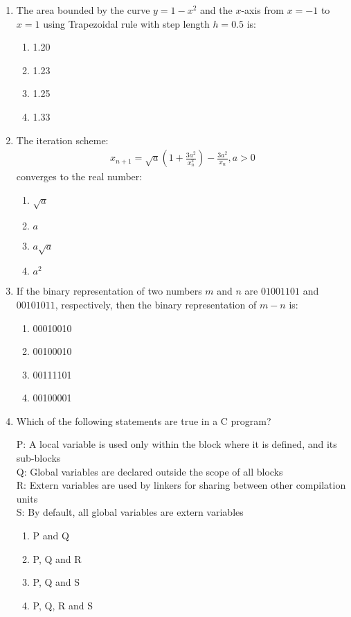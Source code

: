 \documentclass[journal,12pt,onecolumn]{IEEEtran}
\theoremstyle{remark}
\begin{document}
\begin{enumerate}
    \item The area bounded by the curve $y = 1 - x^2$ and the $x$-axis from $x = -1$ to $x = 1$ using Trapezoidal rule with step length $h = 0.5$ is:
    \begin{multicols}{4}
    \begin{enumerate}
        \item 1.20
        \item 1.23
        \item 1.25
        \item 1.33
    \end{enumerate}
\end{multicols}
    \item The iteration scheme:
    \begin{align}
    x_{n+1} = \sqrt{a} \left( 1 + \frac{3a^2}{x_n^2} \right) - \frac{3a^2}{x_n} , a > 0
    \end{align}
    converges to the real number:
    \begin{multicols}{4}
    \begin{enumerate}
        \item $\sqrt{a}$
        \item $a$
        \item $a\sqrt{a}$
        \item $a^2$
    \end{enumerate}
\end{multicols}
    \item If the binary representation of two numbers $m$ and $n$ are $01001101$ and $00101011$, respectively, then the binary representation of $m - n$ is:
    \begin{multicols}{4}
    \begin{enumerate}
        \item 00010010
        \item 00100010
        \item 00111101
        \item 00100001
    \end{enumerate}
\end{multicols}
    \item Which of the following statements are true in a C program?
    
         P: A local variable is used only within the block where it is defined, and its sub-blocks\\
         Q: Global variables are declared outside the scope of all blocks\\
         R: Extern variables are used by linkers for sharing between other compilation units\\
         S: By default, all global variables are extern variables
    \begin{multicols}{4}
    \begin{enumerate}
        \item P and Q
        \item P, Q and R
        \item P, Q and S
        \item P, Q, R and S
    \end{enumerate}


\end{multicols}
\end{enumerate}
\end{document}
